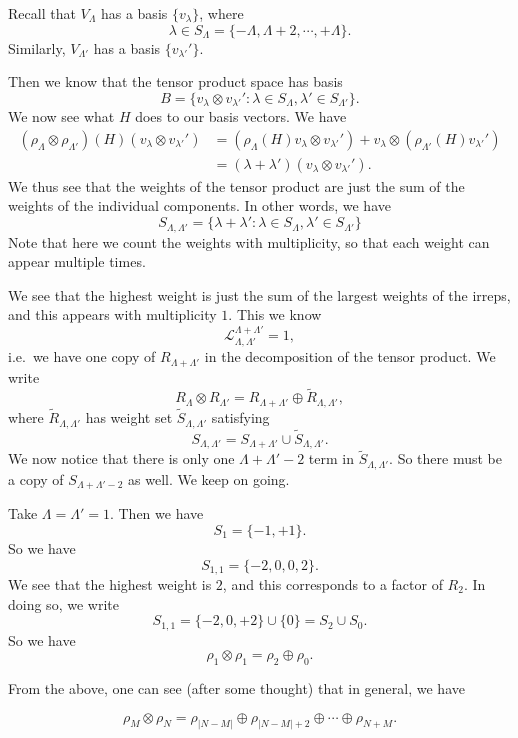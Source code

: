 \documentclass[a4paper]{article}
\begin{document}
Recall that $V_\Lambda$ has a basis $\{v_\lambda\}$, where
\[
  \lambda \in S_\Lambda = \{-\Lambda, \Lambda + 2, \cdots, + \Lambda\}.
\]
Similarly, $V_{\Lambda'}$ has a basis $\{v_{\lambda'}'\}$.

Then we know that the tensor product space has basis
\[
  B = \{v_\lambda \otimes v_{\lambda'}': \lambda \in S_{\Lambda}, \lambda' \in S_{\Lambda'}\}.
\]
We now see what $H$ does to our basis vectors. We have
\begin{align*}
  (\rho_\Lambda \otimes \rho_{\Lambda'})(H)(v_\lambda \otimes v_{\lambda'}') &= (\rho_\Lambda(H)v_\lambda \otimes v_{\lambda'}') + v_\lambda \otimes (\rho_{\Lambda'}(H)v_{\lambda'}')\\
  &= (\lambda + \lambda')(v_\lambda \otimes v_{\lambda'}').
\end{align*}
We thus see that the weights of the tensor product are just the sum of the weights of the individual components. In other words, we have
\[
  S_{\Lambda, \Lambda'} = \{\lambda + \lambda': \lambda \in S_\Lambda, \lambda' \in S_{\Lambda'}\}
\]
Note that here we count the weights with multiplicity, so that each weight can appear multiple times.

We see that the highest weight is just the sum of the largest weights of the irreps, and this appears with multiplicity $1$. This we know
\[
  \mathcal{L}_{\Lambda, \Lambda'}^{\Lambda + \Lambda'} = 1,
\]
i.e.\ we have one copy of $R_{\Lambda + \Lambda'}$ in the decomposition of the tensor product. We write
\[
  R_\Lambda \otimes R_{\Lambda'} = R_{\Lambda + \Lambda'} \oplus \tilde{R}_{\Lambda, \Lambda'},
\]
where $\tilde{R}_{\Lambda, \Lambda'}$ has weight set $\tilde{S}_{\Lambda, \Lambda'}$ satisfying
\[
  S_{\Lambda, \Lambda'} = S_{\Lambda + \Lambda'} \cup \tilde{S}_{\Lambda, \Lambda'}.
\]
We now notice that there is only one $\Lambda + \Lambda' - 2$ term in $\tilde{S}_{\Lambda, \Lambda'}$. So there must be a copy of $S_{\Lambda + \Lambda' - 2}$ as well. We keep on going.

\begin{eg}
  Take $\Lambda = \Lambda' = 1$. Then we have
  \[
    S_1 = \{-1, +1\}.
  \]
  So we have
  \[
    S_{1, 1} = \{-2, 0, 0, 2\}.
  \]
  We see that the highest weight is $2$, and this corresponds to a factor of $R_2$. In doing so, we write
  \[
    S_{1, 1} = \{-2, 0, +2\} \cup \{0\} = S_2 \cup S_0.
  \]
  So we have
  \[
    \rho_1 \otimes \rho_1 = \rho_2 \oplus \rho_0.
  \]
\end{eg}

From the above, one can see (after some thought) that in general, we have
\begin{prop}
  \[
    \rho_M \otimes \rho_N = \rho_{|N - M|} \oplus \rho_{|N - M| + 2} \oplus \cdots \oplus \rho_{N + M}.
  \]
\end{prop}
\end{document}
